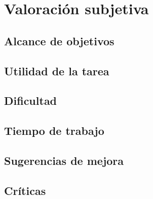 \documentclass[a4paper]{report}
\begin{document}

\newpage




\newpage


\chapter{Valoración subjetiva}
	
	\section*{Alcance de objetivos}
	
	\section*{Utilidad de la tarea}
	
	\section*{Dificultad}
	
	\section*{Tiempo de trabajo}
	
	\section*{Sugerencias de mejora}
	
	\section*{Críticas}
\end{document}
